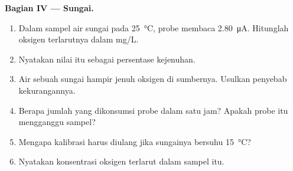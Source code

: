 \begin{problem}
\medskip
\noindent\textbf{Bagian IV --- Sungai.}
\begin{enumerate}[resume]
  \item Dalam sampel air sungai pada \qty{25}{\degreeCelsius}, probe
        membaca \qty{2.80}{\micro A}. Hitunglah oksigen terlarutnya dalam
        \unit{mg/L}.
  \item Nyatakan nilai itu sebagai persentase kejenuhan.
  \item Air sebuah sungai hampir jenuh oksigen di sumbernya. Usulkan
        penyebab kekurangannya.
  \item Berapa jumlah  yang dikonsumsi probe dalam satu jam? Apakah
        probe itu mengganggu sampel?
  \item Mengapa kalibrasi harus diulang jika sungainya bersuhu
        \qty{15}{\degreeCelsius}?
  \item Nyatakan konsentrasi oksigen terlarut dalam sampel itu.
\end{enumerate}
\end{problem}
